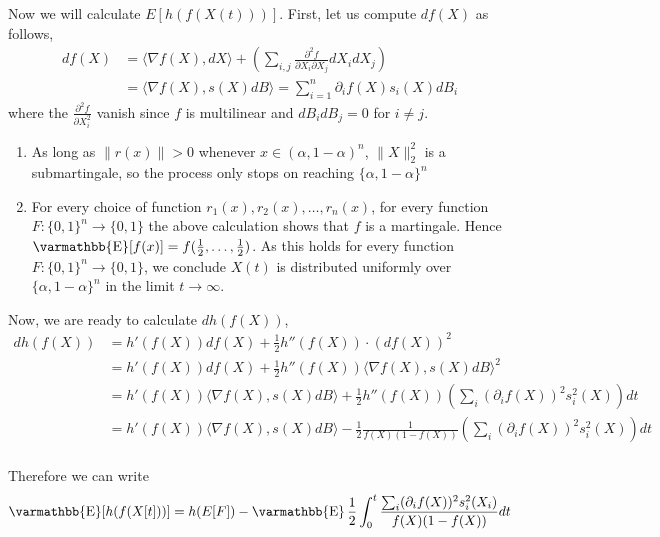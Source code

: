 \documentclass
[12pt,letterpaper]
{article}
\theoremstyle{definition}
\theoremstyle{remark}
\let\mathbb\varmathbb
\newcommand{\norm}[1]{\lVert#1\rVert}
\newcommand{\Esymb}{\mathbb{E}}
\DeclareMathOperator*{\E}{\Esymb}
\newcommand{\bits}{\{0,1\}}
\numberwithin{equation}{section}
\begin{document}


Now we will calculate $E[h(f(X(t)))]$.  First, let us compute $df(X)$ as follows, 
\begin{align}
df(X) & = \langle \nabla f(X), dX \rangle + \left( \sum_{i,j} \frac{\partial^2 f}{\partial X_i \partial X_j} dX_i dX_j\right) \\
	  & = \langle \nabla f(X), s(X)dB \rangle = \sum_{i = 1}^n \partial_i f(X) s_i(X) dB_i
\end{align}
where the $\frac{\partial^2 f}{\partial X_i^2}$ vanish since $f$ is multilinear and $dB_i dB_j = 0$ for $i \neq j$.


\begin{enumerate}
\item  As long as $\norm{r(x)} > 0$ whenever $x \in (\alpha,1-\alpha)^n$, $\norm{X}_2^2$ is a submartingale, so the process only stops on reaching $\{\alpha,1-\alpha\}^n$

\item For every choice of function $r_1(x),r_2(x),\ldots, r_n(x)$,  for every function $F:\bits^n \to \bits$ the above calculation shows that $f$ is a martingale.  Hence $\E[f(x)] = f(\frac{1}{2},\ldots, \frac{1}{2})$.  As this holds for every function $F: \bits^n \to \bits$, we conclude $X(t)$ is distributed uniformly over $\{\alpha,1-\alpha\}^n$ in the limit $t \to \infty$.

\end{enumerate}

Now, we are ready to calculate $dh(f(X))$,
\begin{align*}
dh(f(X)) & = h'(f(X)) df(X) + \frac{1}{2} h''(f(X)) \cdot (df(X))^2 \\
         & = h'(f(X)) df(X) + \frac{1}{2} h''(f(X)) \langle \nabla f(X),s(X) dB \rangle^2 \\
         & = h'(f(X)) \langle \nabla f(X), s(X)dB \rangle + \frac{1}{2} h''(f(X)) \left(\sum_i (\partial_i f(X))^2 s_i^2(X)\right) dt\\
         & = h'(f(X)) \langle \nabla f(X), s(X)dB \rangle - \frac{1}{2} \frac{1}{f(X)(1-f(X))} \left(\sum_i (\partial_i f(X))^2 s_i^2(X)\right) dt\\
\end{align*}

Therefore we can write 
\begin{align} \label{eq2}
\E[h(f(X[t]))] = h(E[F]) - \E \frac{1}{2} \int_0^t \frac{\sum_i (\partial_i f(X))^2 s_i^2(X_i) } {f(X)(1-f(X))} dt  
\end{align}
\end{document}
